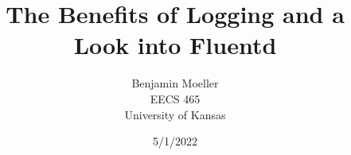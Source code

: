 \documentclass{article}
\title{The Benefits of Logging and a Look into Fluentd}
\author{Benjamin Moeller \\ EECS 465 \\ University of Kansas}
\date{5/1/2022}
\begin{document}
\maketitle
\begin{multicols}{2}


      
\end{multicols}
\end{document}
